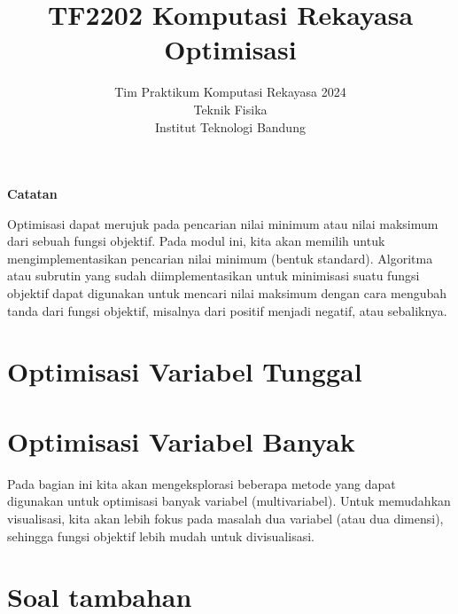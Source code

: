 



\title{%
{\small TF2202 Komputasi Rekayasa}\\
Optimisasi
}
\author{Tim Praktikum Komputasi Rekayasa 2024\\
Teknik Fisika\\
Institut Teknologi Bandung}
\date{}
\maketitle

\textbf{Catatan}

Optimisasi dapat merujuk pada pencarian nilai minimum atau nilai maksimum
dari sebuah fungsi objektif.
Pada modul ini, kita akan memilih untuk mengimplementasikan
pencarian nilai minimum (bentuk standard).
Algoritma atau subrutin yang sudah diimplementasikan
untuk minimisasi suatu fungsi objektif dapat digunakan untuk mencari nilai maksimum
dengan cara mengubah tanda dari fungsi objektif, misalnya dari positif menjadi negatif,
atau sebaliknya.


\section{Optimisasi Variabel Tunggal}
%





\section{Optimisasi Variabel Banyak}
Pada bagian ini kita akan mengeksplorasi beberapa metode yang dapat
digunakan untuk optimisasi banyak variabel (multivariabel). Untuk
memudahkan visualisasi, kita akan lebih fokus pada masalah dua variabel
(atau dua dimensi), sehingga fungsi objektif lebih mudah untuk divisualisasi.








\section{Soal tambahan}







